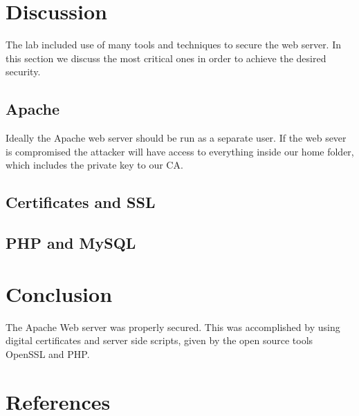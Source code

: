 \documentclass[a4paper, 12pt]{article}
\begin{document}
\section{Discussion}
The lab included use of many tools and techniques to secure the web server. In this section we discuss the most critical ones in order to achieve the desired security.
\subsection{Apache}
Ideally the Apache web server should be run as a separate user. If the web sever is compromised the attacker will have access to everything inside our home folder, which includes the private key to our CA.
\subsection{Certificates and SSL}
\subsection{PHP and MySQL}
\section{Conclusion}
The Apache Web server was properly secured. This was accomplished by using digital certificates and server side scripts, given by the open source tools OpenSSL and PHP. 

\section{References}
\newpage
\renewcommand*{\bibname}{\vspace{-20pt}\section{References}\vspace{-20pt}}


\end{document}
